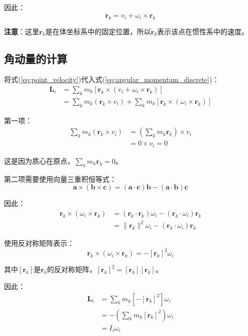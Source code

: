 \documentclass[12pt,a4paper]{article}
\begin{document}
因此：
\begin{equation}
\dot{\bm{r}}_k = v_i + \omega_i \times \bm{r}_k
\label{eq:point_velocity}
\end{equation}

\textbf{注意}：这里$\bm{r}_k$是在体坐标系中的固定位置，所以$\dot{\bm{r}}_k$表示该点在惯性系中的速度。

\subsection{角动量的计算}

将式(\ref{eq:point_velocity})代入式(\ref{eq:angular_momentum_discrete})：
\begin{align}
\bm{L}_i &= \sum_k m_k [\bm{r}_k \times (v_i + \omega_i \times \bm{r}_k)] \\
&= \sum_k m_k (\bm{r}_k \times v_i) + \sum_k m_k [\bm{r}_k \times (\omega_i \times \bm{r}_k)]
\end{align}

第一项：
\begin{align}
\sum_k m_k (\bm{r}_k \times v_i) &= \left(\sum_k m_k \bm{r}_k\right) \times v_i \\
&= 0 \times v_i = 0
\end{align}

这是因为质心在原点，$\sum_k m_k \bm{r}_k = 0$。

第二项需要使用向量三重积恒等式：
\begin{equation}
\bm{a} \times (\bm{b} \times \bm{c}) = (\bm{a} \cdot \bm{c})\bm{b} - (\bm{a} \cdot \bm{b})\bm{c}
\end{equation}

因此：
\begin{align}
\bm{r}_k \times (\omega_i \times \bm{r}_k) &= (\bm{r}_k \cdot \bm{r}_k)\omega_i - (\bm{r}_k \cdot \omega_i)\bm{r}_k \\
&= \|\bm{r}_k\|^2 \omega_i - (\bm{r}_k \cdot \omega_i)\bm{r}_k
\end{align}

使用反对称矩阵表示：
\begin{equation}
\bm{r}_k \times (\omega_i \times \bm{r}_k) = -[\bm{r}_k]^2 \omega_i
\end{equation}

其中$[\bm{r}_k]$是$\bm{r}_k$的反对称矩阵，$[\bm{r}_k]^2 = [\bm{r}_k][\bm{r}_k]$。

因此：
\begin{align}
\bm{L}_i &= \sum_k m_k [-[\bm{r}_k]^2] \omega_i \\
&= -\left(\sum_k m_k [\bm{r}_k]^2\right) \omega_i \\
&= I_i \omega_i
\label{eq:angular_momentum_result}
\end{align}
\end{document}
